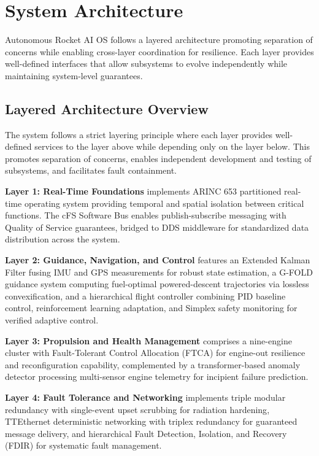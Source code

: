 \documentclass[10pt, conference, compsocconf]{IEEEtran}
\begin{document}
\section{System Architecture}
\label{sec:architecture}

Autonomous Rocket AI OS follows a layered architecture promoting separation of concerns while enabling cross-layer coordination for resilience. Each layer provides well-defined interfaces that allow subsystems to evolve independently while maintaining system-level guarantees.

\subsection{Layered Architecture Overview}

The system follows a strict layering principle where each layer provides well-defined services to the layer above while depending only on the layer below. This promotes separation of concerns, enables independent development and testing of subsystems, and facilitates fault containment\cite{cziklovszki2020avionics}.

\textbf{Layer 1: Real-Time Foundations} implements ARINC 653 partitioned real-time operating system providing temporal and spatial isolation between critical functions\cite{arinc653wiki}. The cFS Software Bus enables publish-subscribe messaging with Quality of Service guarantees, bridged to DDS middleware for standardized data distribution across the system\cite{cfsnasa}.

\textbf{Layer 2: Guidance, Navigation, and Control} features an Extended Kalman Filter fusing IMU and GPS measurements for robust state estimation\cite{ijertekf}, a G-FOLD guidance system computing fuel-optimal powered-descent trajectories via lossless convexification\cite{acikmese2007convex}, and a hierarchical flight controller combining PID baseline control, reinforcement learning adaptation, and Simplex safety monitoring for verified adaptive control\cite{seto2025use}.

\textbf{Layer 3: Propulsion and Health Management} comprises a nine-engine cluster with Fault-Tolerant Control Allocation (FTCA) for engine-out resilience and reconfiguration capability\cite{mdpiftca}, complemented by a transformer-based anomaly detector processing multi-sensor engine telemetry for incipient failure prediction\cite{lee2019deep}.

\textbf{Layer 4: Fault Tolerance and Networking} implements triple modular redundancy with single-event upset scrubbing for radiation hardening\cite{wikipediatmr}, TTEthernet deterministic networking with triplex redundancy for guaranteed message delivery\cite{tttechethernet}, and hierarchical Fault Detection, Isolation, and Recovery (FDIR) for systematic fault management.
\end{document}
